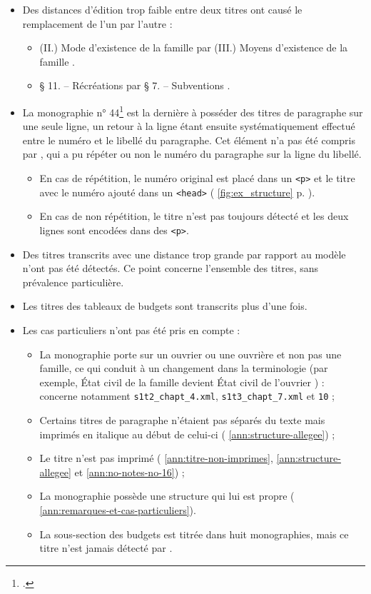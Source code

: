 \begin{itemize}
    \item Des distances d'édition trop faible entre deux titres ont causé le remplacement de l'un par l'autre :
    \begin{itemize}
        \item (II.) \og Mode d'existence de la famille \fg{} par (III.) \og Moyens d'existence de la famille \fg.
        \item \og § 11. -- Récréations \fg{} par \og § 7. -- Subventions \fg.
    \end{itemize}
    \item La monographie n° 44\footcite{mono044a} est la dernière à posséder des titres de paragraphe sur une seule ligne, un retour à la ligne étant ensuite systématiquement effectué entre le numéro et le libellé du paragraphe. Cet élément n'a pas été compris par \lse, qui a pu répéter ou non le numéro du paragraphe sur la ligne du libellé.
    \begin{itemize}
        \item En cas de répétition, le numéro original est placé dans un \texttt{<p>} et le titre avec le numéro ajouté dans un \texttt{<head>} (\fig{} \ref{fig:ex_structure} p. \pageref{fig:ex_structure}).
        \item En cas de non répétition, le titre n'est pas toujours détecté et les deux lignes sont encodées dans des \texttt{<p>}.
    \end{itemize}
    \item Des titres transcrits avec une distance trop grande par rapport au modèle n'ont pas été détectés. Ce point concerne l'ensemble des titres, sans prévalence particulière.
    \item Les titres des tableaux de budgets sont transcrits plus d'une fois.
    \item Les cas particuliers n'ont pas été pris en compte :
    \begin{itemize}
        \item La monographie porte sur un ouvrier ou une ouvrière et non pas une famille, ce qui conduit à un changement dans la terminologie (par exemple, \og État civil de la famille \fg{} devient \og État civil de l'ouvrier \fg) : concerne notamment \texttt{s1t2\_chapt\_4.xml}, \texttt{s1t3\_chapt\_7.xml} et \texttt{10} ;
        \item Certains titres de paragraphe n'étaient pas séparés du texte mais imprimés en italique au début de celui-ci (\ann{} \ref{ann:structure-allegee}) ;
        \item Le titre n'est pas imprimé (\ann{} \ref{ann:titre-non-imprimes}, \ref{ann:structure-allegee} et \ref{ann:no-notes-no-16}) ;
        \item La monographie possède une structure qui lui est propre (\ann{} \ref{ann:remarques-et-cas-particuliers}).
        \item La sous-section des budgets est titrée dans huit monographies, mais ce titre n'est jamais détecté par \lse.
    \end{itemize}
\end{itemize}

